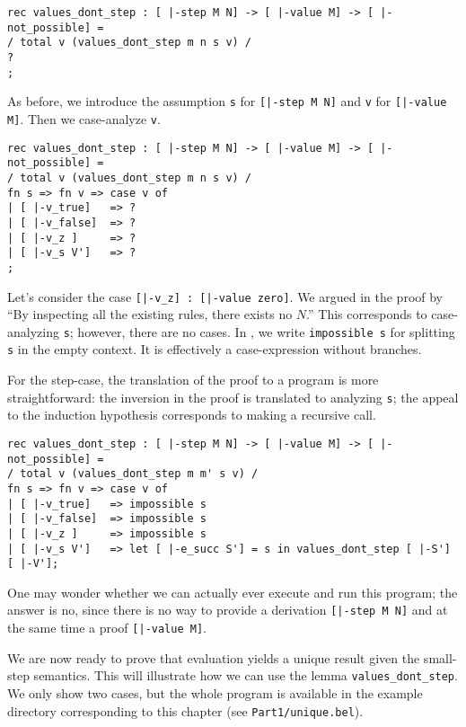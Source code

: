 \begin{lstlisting}
rec values_dont_step : [ |-step M N] -> [ |-value M] -> [ |-not_possible] =
/ total v (values_dont_step m n s v) /
?
;
\end{lstlisting}

As before, we introduce the assumption \lstinline!s! for
\lstinline![|-step M N]! and \lstinline!v! for
\lstinline![|-value M]!. Then we case-analyze \lstinline!v!.

\begin{lstlisting}
rec values_dont_step : [ |-step M N] -> [ |-value M] -> [ |-not_possible] =
/ total v (values_dont_step m n s v) /
fn s => fn v => case v of
| [ |-v_true]   => ?
| [ |-v_false]  => ?
| [ |-v_z ]     => ?
| [ |-v_s V']   => ?
;
\end{lstlisting}

Let's consider the case \lstinline![|-v_z] : [|-value zero]!. We argued in the
proof by ``By inspecting all the existing rules, there exists no $N$.'' This
corresponds to case-analyzing \lstinline!s!; however, there are no cases. In
\beluga, we write \lstinline!impossible s! for splitting \lstinline!s! in
the empty context. It is effectively a case-expression without branches.

For the step-case, the translation of the proof to a program is more
straightforward: the inversion in the proof is translated to analyzing
\lstinline!s!; the appeal to the induction hypothesis corresponds to making a
recursive call.

\begin{lstlisting}
rec values_dont_step : [ |-step M N] -> [ |-value M] -> [ |-not_possible] =
/ total v (values_dont_step m m' s v) /
fn s => fn v => case v of
| [ |-v_true]   => impossible s
| [ |-v_false]  => impossible s
| [ |-v_z ]     => impossible s
| [ |-v_s V']   => let [ |-e_succ S'] = s in values_dont_step [ |-S'] [ |-V'];
\end{lstlisting}

One may wonder whether we can actually ever execute and run this program; the
answer is no, since there is no way to provide a derivation
\lstinline![|-step M N]! and at the same time a proof \lstinline![|-value M]!.

We are now ready to prove that evaluation yields a unique result given the
small-step semantics. This will illustrate how we can use the lemma
\lstinline!values_dont_step!. We only show two cases, but the whole program is
available in the example directory corresponding to this chapter
(see \verb|Part1/unique.bel|).

